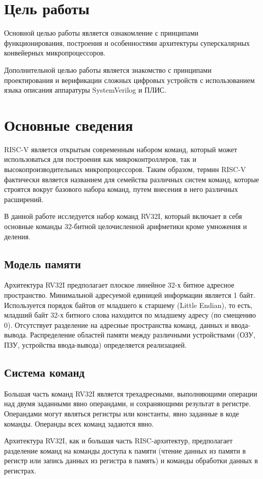 \chapter*{Цель работы}

Основной целью работы является ознакомление с принципами 
функцио\-нирования, построения и особенностями архитектуры 
суперскалярных кон\-вейерных микропроцессоров.

Дополнительной целью работы является знакомство с принципами 
про\-ектирования и верификации сложных цифровых устройств с использованием
языка описания аппаратуры SystemVerilog и ПЛИС.

\chapter{Основные сведения}

RISC-V является открытым современным набором команд, кото\-рый может 
использоваться для построения как микроконтроллеров, так и 
высоко\-производительных микропроцессоров. Таким образом, термин RISC-V 
фак\-тически является названием для семейства различных систем команд, 
кото\-рые строятся вокруг базового набора команд, путем внесения в него
различ\-ных расширений.

В данной работе исследуется набор команд RV32I, который включает в себя 
основные команды 32-битной целочисленной арифметики кроме умно\-жения и 
деления.

\section{Модель памяти}
Архитектура RV32I предполагает плоское линейное 32-х битное адрес\-ное 
пространство. Минимальной адресуемой единицей информации является 1 байт. 
Используется порядок байтов от младшего к старшему (Little Endian), 
то есть, младший байт 32-х битного слова находится по младшему адресу 
(по смещению 0). Отсутствует разделение на адресные пространства команд, 
данных и ввода-вывода. Распределение областей памяти между различными 
устройствами (ОЗУ, ПЗУ, устройства ввода-вывода) определяется реализа\-цией.

\section{Система команд}
Большая часть команд RV32I является трехадресными, выполня\-ющими операции 
над двумя заданными явно операндами, и сохраняющими результат в регистре. 
Операндами могут являться регистры или константы, явно задан\-ные в коде 
команды. Операнды всех команд задаются явно.

Архитектура RV32I, как и большая часть RISC-архитектур, предпо\-лагает
разделение команд на команды доступа к памяти (чтение данных из памяти 
в регистр или запись данных из регистра в память) и команды обработки 
данных в регистрах.
